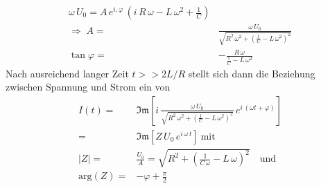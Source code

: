 \documentclass[a4paper, 12pt,]{scrartcl}
\begin{document}
\begin{align*}\omega\,U_0=A\,e^{i,\varphi}\,\left(i\,R\,\omega-L\,\omega^2+\frac{1}{C}\right)\\
\Rightarrow\;A=&\frac{\omega\,U_0}{\sqrt{R^2\,\omega^2+\left(\frac{1}{C}-L\,\omega^2\right)^2}}\\
\tan\varphi=&-\frac{R\,\omega}{\frac{1}{C}-L\,\omega^2}\end{align*}
Nach ausreichend langer Zeit $t>>2L/R$ stellt sich dann die Beziehung zwischen Spannung und Strom ein von
\begin{align*}I(t)=&\mathfrak{Im}\left[i\,\frac{\omega\,U_0}{\sqrt{R^2\,\omega^2+\left(\frac{1}{C}-L\,\omega^2\right)^2}}\,e^{i\,(\omega{t}+\varphi)}\right]\\
=&\mathfrak{Im}\left[Z\,U_0\,e^{i\,\omega\,t}\right]\:\text{mit}\\
|Z|=&\frac{U_0}{A}=\sqrt{R^2+\left(\frac{1}{C\,\omega}-L\,\omega\right)^2}\quad\text{und}\\
\text{arg}(Z)=&-\varphi+\frac{\pi}{2}\end{align*}
\end{document}
